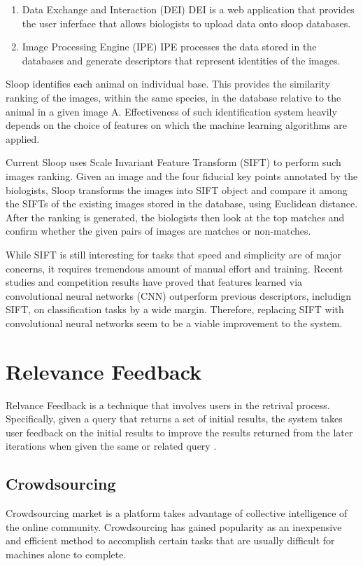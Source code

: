 \begin{enumerate}
	\item Data Exchange and Interaction (DEI)
	DEI is a web application that provides the user inferface that allows biologists to upload data onto sloop databases.
	\item Image Processing Engine (IPE)
	IPE processes the data stored in the databases and generate descriptors that represent identities of the images.
\end{enumerate}


Sloop identifies each animal on individual base. This provides the similarity ranking of the images, within the same species, in the database relative to the animal in a given image A. Effectiveness of such identification system heavily depends on the choice of features on which the machine learning algorithms are applied.

Current Sloop uses Scale Invariant Feature Transform (SIFT) \cite{lowe04} to perform such images ranking. Given an image and the four fiducial key points annotated by the biologists, Sloop transforms the images into SIFT object and compare it among the SIFTs of the existing images stored in the database, using Euclidean distance. After the ranking is generated, the biologists then look at the top matches and confirm whether the given pairs of images are matches or non-matches. 

While SIFT is still interesting for tasks that speed and simplicity are of major concerns, it requires tremendous amount of manual effort and training. Recent studies and competition results have proved that features learned via convolutional neural networks (CNN) outperform previous descriptors, includign SIFT, on classification tasks by a wide margin\cite{fisher14}. Therefore, replacing SIFT with convolutional neural networks seem to be a viable improvement to the system.

\section{Relevance Feedback}

Relvance Feedback is a technique that involves users in the retrival process. Specifically, given a query that returns a set of initial results, the system takes user feedback on the initial results to improve the results returned from the later iterations when given the same or related query \cite{manning2008introduction}.

\subsection{Crowdsourcing}
Crowdsourcing market is a platform takes advantage of collective intelligence of the online community. Crowdsourcing has gained popularity as an inexpensive and efficient method to accomplish certain tasks that are usually difficult for machines alone to complete.

